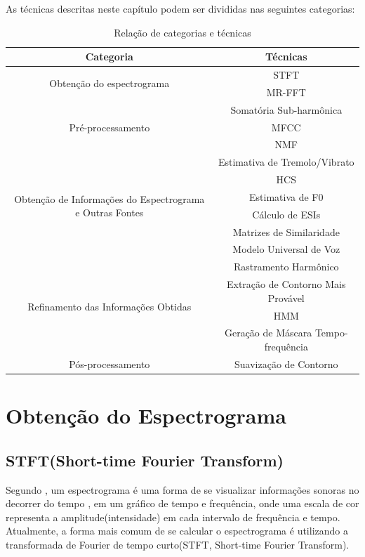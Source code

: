 \documentclass[
	12pt,				%
	openright,			%
	oneside,			%
	a4paper,			%
	english,			%
	brazil,				%
	]{abntex2}
\begin{document}
As técnicas descritas neste capítulo podem ser divididas nas seguintes categorias:
\begin{table}[]
    \centering
    \begin{tabular}{|c|c|}
        \hline
        Categoria & Técnicas \\
        \hline
        \multirow{2}{150pt}{Obtenção do espectrograma}
            & STFT\\
            & MR-FFT \\
        \hline
        \multirow{3}{150pt}{Pré-processamento}
            & Somatória Sub-harmônica \\
            & MFCC \\
            & NMF \\
        \hline
        \multirow{6}{150pt}{Obtenção de Informações do Espectrograma e Outras Fontes}
            & Estimativa de Tremolo/Vibrato \\
            & HCS \\
            & Estimativa de F0 \\
            & Cálculo de ESIs \\
            & Matrizes de Similaridade \\
            & Modelo Universal de Voz \\
        \hline
        \multirow{4}{150pt}{Refinamento das Informações Obtidas}
            & Rastramento Harmônico \\
            & Extração de Contorno Mais Provável \\
            & HMM \\
            & Geração de Máscara Tempo-frequência \\
        \hline
        \multirow{1}{150pt}{Pós-processamento}
            & Suavização de Contorno \\
        \hline
    \end{tabular}
    \caption{Relação de categorias e técnicas}
    \label{tab:Cat_Tecnicas}
\end{table}


\section{Obtenção do Espectrograma}
\subsection{STFT(Short-time Fourier Transform)}
Segundo , um espectrograma é uma forma de se visualizar informações sonoras no decorrer do tempo , em um gráfico de tempo e frequência, onde uma escala de cor representa a amplitude(intensidade) em cada intervalo de frequência e tempo. Atualmente, a forma mais comum de se calcular o espectrograma é utilizando a transformada de Fourier de tempo curto(STFT, Short-time Fourier Transform).
\end{document}
